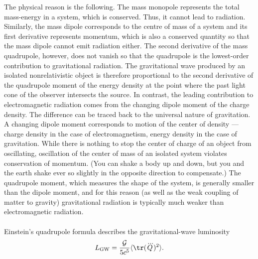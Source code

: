 The physical reason is the following. The mass monopole represents the total mass-energy in a system, which is conserved. Thus, it cannot lead to radiation. Similarly, the mass dipole corresponds to the centre of mass of a system and its first derivative represents momentum, which is also a conserved quantity so that the mass dipole cannot emit radiation either. The second derivative of the mass quadrupole, however, does not vanish so that the quadrupole is the lowest-order contribution to gravitational radiation. The gravitational wave produced by an isolated nonrelativistic object is therefore proportional to the second derivative of the quadrupole moment of the energy density at the point where the past light cone of the observer intersects the source. In contrast, the leading
contribution to electromagnetic radiation comes from the changing dipole moment of the
charge density. The difference can be traced back to the universal nature of gravitation. A
changing dipole moment corresponds to motion of the center of density — charge density in
the case of electromagnetism, energy density in the case of gravitation. While there is nothing to stop the center of charge of an object from oscillating, oscillation of the center of mass
of an isolated system violates conservation of momentum. (You can shake a body up and
down, but you and the earth shake ever so slightly in the opposite direction to compensate.)
The quadrupole moment, which measures the shape of the system, is generally smaller than
the dipole moment, and for this reason (as well as the weak coupling of matter to gravity)
gravitational radiation is typically much weaker than electromagnetic radiation.
\\
\\
Einstein's quadrupole formula describes the gravitational-wave luminosity
\begin{equation}
	L_{\mathrm{GW}} = \frac{\mathcal{G}}{5 c^5} \langle \tr(\dddot{Q})^2\rangle.
\end{equation}




























